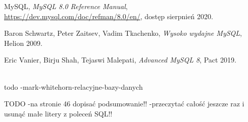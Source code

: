 \begin{thebibliography}{}
	
	 MySQL, \emph{MySQL 8.0 Reference Manual}, \url{https://dev.mysql.com/doc/refman/8.0/en/}, dostęp sierpnień 2020.
	
	 Baron Schwartz, Peter Zaitsev, Vadim Tkachenko,  \emph{Wysoko wydajne MySQL}, Helion 2009.
	
	 Eric Vanier, Birju Shah, Tejaswi Malepati,  \emph{Advanced MySQL 8}, Pact 2019.
		
	\\todo -mark-whitehorn-relacyjne-bazy-danych
	
	TODO
	-na stronie 46 dopisać podsumowanie!!
	-przeczytać całość jeszcze raz i usunąć małe litery z poleceń SQL!!
	
\end{thebibliography}
